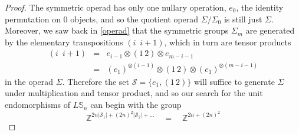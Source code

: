 \documentclass{amsbook} %
\numberwithin{section}{chapter}
\begin{document}
\begin{proof}
The symmetric operad has only one nullary operation, $e_0$, the identity permutation on 0 objects, and so the quotient operad $\Sigma/\Sigma_0$ is still just $\Sigma$. Moreover, we saw back in \cref{operad} that the symmetric groups $\Sigma_m$ are generated by the elementary transpositions $(i \, \, \, i+1)$, which in turn are tensor products
\[ \begin{array}{rll}
			(i \, \, \,  i+1) & = & e_{i-1} \otimes (1 \, 2) \otimes e_{m-i-1} \\
			& = & (e_1)^{\otimes (i-1)} \otimes (1 \, 2) \otimes (e_1)^{\otimes (m-i-1)}
		\end{array}
\]
in the operad $\Sigma$. Therefore the set $\mathcal{S} = \{ e_1, (1 \, 2) \}$ will suffice to generate $\Sigma$ under multiplication and tensor product, and so our search for the unit endomorphisms of $L\mathbb{S}_n$ can begin with the group
\[ \mathbb{Z}^{2n|\mathcal{S}_1| + (2n)^2|\mathcal{S}_2| + \ldots}  \quad = \quad \mathbb{Z}^{2n + (2n)^2} \]


\end{proof}
\end{document}

